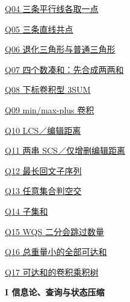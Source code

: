 \documentclass[10pt,a4paper]{article}
\begin{document}
\noindent\hyperref[Q04]{Q04 三条平行线各取一点\nobreak\hfill\pageref*{Q04}}\par\vspace{1.5pt}
\noindent\hyperref[Q05]{Q05 三条直线共点\nobreak\hfill\pageref*{Q05}}\par\vspace{1.5pt}
\noindent\hyperref[Q06]{Q06 退化三角形与普通三角形\nobreak\hfill\pageref*{Q06}}\par\vspace{1.5pt}
\noindent\hyperref[Q07]{Q07 四个数凑和：先合成两两和\nobreak\hfill\pageref*{Q07}}\par\vspace{1.5pt}
\noindent\hyperref[Q08]{Q08 下标卷积型 3SUM\nobreak\hfill\pageref*{Q08}}\par\vspace{1.5pt}
\noindent\hyperref[Q09]{Q09 min/max-plus 卷积\nobreak\hfill\pageref*{Q09}}\par\vspace{1.5pt}
\noindent\hyperref[Q10]{Q10 LCS／编辑距离\nobreak\hfill\pageref*{Q10}}\par\vspace{1.5pt}
\noindent\hyperref[Q11]{Q11 两串 SCS／仅增删编辑距离\nobreak\hfill\pageref*{Q11}}\par\vspace{1.5pt}
\noindent\hyperref[Q12]{Q12 最长回文子序列\nobreak\hfill\pageref*{Q12}}\par\vspace{1.5pt}
\noindent\hyperref[Q13]{Q13 任意集合判空交\nobreak\hfill\pageref*{Q13}}\par\vspace{1.5pt}
\noindent\hyperref[Q14]{Q14 子集和\nobreak\hfill\pageref*{Q14}}\par\vspace{1.5pt}
\noindent\hyperref[Q15]{Q15 WQS 二分会跳过数量\nobreak\hfill\pageref*{Q15}}\par\vspace{1.5pt}
\noindent\hyperref[Q16]{Q16 总重量小的全部可达和\nobreak\hfill\pageref*{Q16}}\par\vspace{1.5pt}
\noindent\hyperref[Q17]{Q17 可达和的卷积乘积树\nobreak\hfill\pageref*{Q17}}\par\vspace{1.5pt}
\par\vspace{6pt}\textbf{I 信息论、查询与状态压缩}\par\vspace{3pt}
\end{document}
